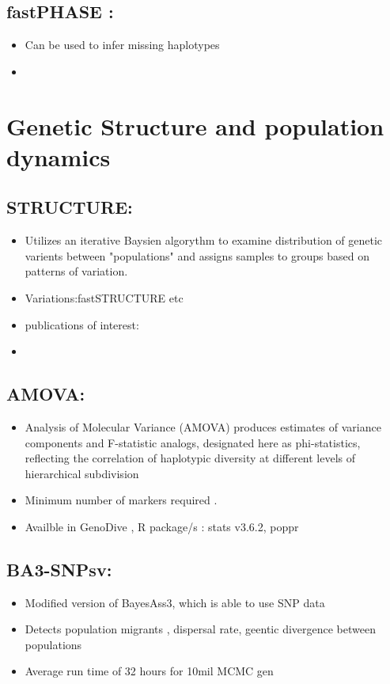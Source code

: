 \documentclass[document.tex]{subfiles}
\begin{document}
    \subsection{fastPHASE :\citetitle{}}
    \begin{itemize}
    \item Can be used to infer missing haplotypes
    \item 
    \end{itemize}

\section*{Genetic Structure and population dynamics}
    \subsection{STRUCTURE: }
        \begin{itemize}
        \item Utilizes an iterative Baysien algorythm to examine distribution of genetic 
        varients between "populations" and assigns samples to groups based on patterns of 
        variation.
        \item Variations:fastSTRUCTURE etc 
        \item publications of interest:
        \item 
        \end{itemize} 

    \subsection{AMOVA: }
        \begin{itemize}
        \item Analysis of Molecular Variance (AMOVA) produces estimates of variance components and F-statistic analogs, designated here as phi-statistics, reflecting the correlation of haplotypic diversity at different levels of hierarchical subdivision
        \item Minimum number of markers required .
        \item Availble in GenoDive \cite{meirmans_2020}, R package/s : stats v3.6.2, poppr
        \end{itemize} 

    \subsection{BA3-SNPsv: }
         \begin{itemize}
        \item Modified version of BayesAss3, which is able to use SNP data
        \item Detects population migrants , dispersal rate, geentic divergence between populations
        \item Average run time of 32 hours for 10mil MCMC gen 
        \end{itemize} 
\end{document}
